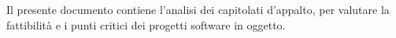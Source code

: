 Il presente documento contiene l'analisi dei capitolati d'appalto, per valutare la fattibilità e i punti critici dei progetti software in oggetto.
